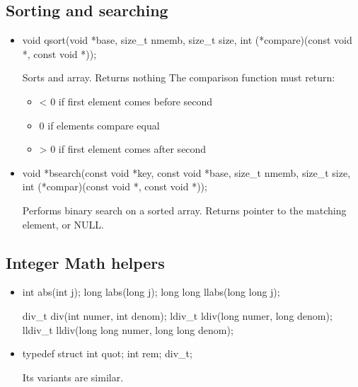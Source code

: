 \documentclass{report}
\begin{document}
    \subsection{Sorting and searching}
    \begin{itemize}
        \item 
            \bigbreak \noindent 
            \begin{cppcode}
                void qsort(void *base, size_t nmemb, size_t size, int (*compare)(const void *, const void *));
            \end{cppcode}
            \bigbreak \noindent 
            Sorts and array. Returns nothing
            \bigbreak \noindent 
            The comparison function must return:
            \begin{itemize}
                \item < 0   if first element comes before second
                \item 0   if elements compare equal
                \item > 0   if first element comes after second
            \end{itemize}
        \item 
            \begin{cppcode}
                void *bsearch(const void *key, const void *base, size_t nmemb, size_t size, int (*compar)(const void *, const void *));
            \end{cppcode}
            \bigbreak \noindent 
            Performs binary search on a sorted array.
            \bigbreak \noindent 
            Returns pointer to the matching element, or NULL.

    \end{itemize}

    \pagebreak 
    \subsection{Integer Math helpers}
    \begin{itemize}
                \item 
            \begin{cppcode}
                int abs(int j);        
                long labs(long j);
                long long llabs(long long j);

                div_t div(int numer, int denom);
                ldiv_t ldiv(long numer, long denom);
                lldiv_t lldiv(long long numer, long long denom);
            \end{cppcode}
        \item 
            \bigbreak \noindent 
            \begin{cppcode}
                typedef struct {
                    int quot;
                    int rem;
                } div_t;
            \end{cppcode}
            \bigbreak \noindent 
            Its variants are similar.

    \end{itemize}

    
\end{document}

